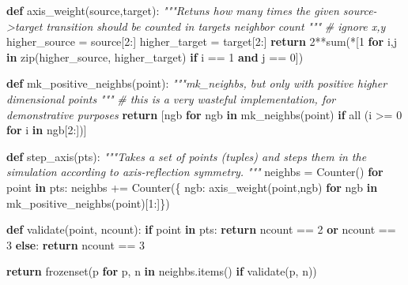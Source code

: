 \documentclass[]{article}
\newenvironment{Shaded}{}{}
\newcommand{\BuiltInTok}[1]{#1}
\newcommand{\CommentTok}[1]{\textcolor[rgb]{0.38,0.63,0.69}{\textit{#1}}}
\newcommand{\ControlFlowTok}[1]{\textcolor[rgb]{0.00,0.44,0.13}{\textbf{#1}}}
\newcommand{\DecValTok}[1]{\textcolor[rgb]{0.25,0.63,0.44}{#1}}
\newcommand{\KeywordTok}[1]{\textcolor[rgb]{0.00,0.44,0.13}{\textbf{#1}}}
\newcommand{\NormalTok}[1]{#1}
\newcommand{\OperatorTok}[1]{\textcolor[rgb]{0.40,0.40,0.40}{#1}}
\begin{document}
\begin{Shaded}
\begin{Highlighting}[]
\KeywordTok{def}\NormalTok{ axis\_weight(source,target):}
    \CommentTok{"""Retuns how many times the given source{-}>target transition should be}
\CommentTok{    counted in target\textquotesingle{}s neighbor count}
\CommentTok{    """}
    \CommentTok{\# ignore x,y}
\NormalTok{    higher\_source }\OperatorTok{=}\NormalTok{ source[}\DecValTok{2}\NormalTok{:]}
\NormalTok{    higher\_target }\OperatorTok{=}\NormalTok{ target[}\DecValTok{2}\NormalTok{:]}
    \ControlFlowTok{return} \DecValTok{2}\OperatorTok{**}\BuiltInTok{sum}\NormalTok{(}\OperatorTok{*}\NormalTok{[}\DecValTok{1} \ControlFlowTok{for}\NormalTok{ i,j }\KeywordTok{in} \BuiltInTok{zip}\NormalTok{(higher\_source, higher\_target) }\ControlFlowTok{if}\NormalTok{ i }\OperatorTok{==} \DecValTok{1} \KeywordTok{and}\NormalTok{ j }\OperatorTok{==} \DecValTok{0}\NormalTok{])}

\KeywordTok{def}\NormalTok{ mk\_positive\_neighbs(point):}
    \CommentTok{"""mk\_neighbs, but only with positive higher dimensional points}
\CommentTok{    """}
    \CommentTok{\# this is a very wasteful implementation, for demonstrative purposes}
    \ControlFlowTok{return}\NormalTok{ [ngb }\ControlFlowTok{for}\NormalTok{ ngb }\KeywordTok{in}\NormalTok{ mk\_neighbs(point) }\ControlFlowTok{if} \BuiltInTok{all}\NormalTok{ (i }\OperatorTok{>=} \DecValTok{0} \ControlFlowTok{for}\NormalTok{ i }\KeywordTok{in}\NormalTok{ ngb[}\DecValTok{2}\NormalTok{:])]}

\KeywordTok{def}\NormalTok{ step\_axis(pts):}
    \CommentTok{"""Takes a set of points (tuples) and steps them in the simulation}
\CommentTok{    according to axis{-}reflection symmetry.}
\CommentTok{    """}
\NormalTok{    neighbs }\OperatorTok{=}\NormalTok{ Counter()}
    \ControlFlowTok{for}\NormalTok{ point }\KeywordTok{in}\NormalTok{ pts:}
\NormalTok{        neighbs }\OperatorTok{+=}\NormalTok{ Counter(\{ ngb: axis\_weight(point,ngb) }\ControlFlowTok{for}\NormalTok{ ngb }\KeywordTok{in}\NormalTok{ mk\_positive\_neighbs(point)[}\DecValTok{1}\NormalTok{:]\})}

    \KeywordTok{def}\NormalTok{ validate(point, ncount):}
        \ControlFlowTok{if}\NormalTok{ point }\KeywordTok{in}\NormalTok{ pts:}
            \ControlFlowTok{return}\NormalTok{ ncount }\OperatorTok{==} \DecValTok{2} \KeywordTok{or}\NormalTok{ ncount }\OperatorTok{==} \DecValTok{3}
        \ControlFlowTok{else}\NormalTok{:}
            \ControlFlowTok{return}\NormalTok{ ncount }\OperatorTok{==} \DecValTok{3}

    \ControlFlowTok{return} \BuiltInTok{frozenset}\NormalTok{(p }\ControlFlowTok{for}\NormalTok{ p, n }\KeywordTok{in}\NormalTok{ neighbs.items() }\ControlFlowTok{if}\NormalTok{ validate(p, n))}
\end{Highlighting}
\end{Shaded}
\end{document}
